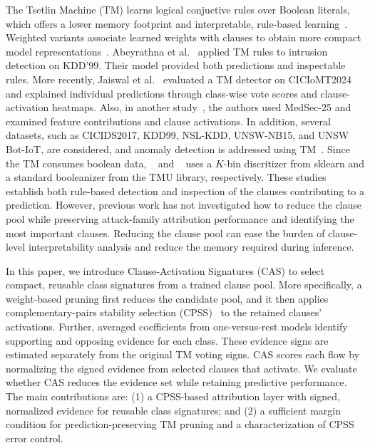 \documentclass[conference]{IEEEtran}
\begin{document}
The Tsetlin Machine (TM) learns logical conjuctive rules over Boolean
literals, which offers a lower memory footprint and interpretable, rule-based learning~\cite{granmo2018}. Weighted variants associate learned weights with clauses to obtain more compact model representations~\cite{phoulady2020}. Abeyrathna
et al.~\cite{abeyrathna2020} applied TM rules to intrusion detection on
KDD'99. Their model provided both predictions and inspectable rules.
More recently, Jaiswal et al.~\cite{jaiswal2026iomt} evaluated a TM detector on CICIoMT2024 and explained individual predictions through class-wise vote scores and clause-activation heatmaps. Also, in another study~\cite{jaiswal2026medsec}, the authors used MedSec-25 and examined feature contributions and clause activations. In addition, several datasets, such as CICIDS2017, KDD99, NSL-KDD, UNSW-NB15, and UNSW Bot-IoT, are considered, and anomaly detection is addressed using TM~\cite{10455063}. Since the TM consumes boolean data, ~\cite{jaiswal2026iomt,jaiswal2026medsec} and ~\cite{10455063} uses a $K$-bin discritizer from sklearn and a standard booleanizer from the TMU library, respectively. These studies establish both rule-based detection and
inspection of the clauses contributing to a prediction. However, previous work has not investigated how to reduce the clause pool while preserving attack-family attribution performance and identifying the most important clauses. Reducing the clause pool can ease the burden of clause-level interpretability analysis and reduce the memory required during inference.
 

In this paper, we introduce Clause-Activation Signatures (CAS)
to select compact, reusable class signatures from a trained clause pool. More specifically, a weight-based pruning first reduces the candidate pool, and it then applies complementary-pairs stability selection (CPSS)~\cite{meinshausen2010,shah2013} to the retained clauses' activations. Further, averaged coefficients from
one-versus-rest models identify supporting and opposing evidence for
each class. These evidence signs are estimated separately from the
original TM voting signs. CAS scores each flow by normalizing the signed
evidence from selected clauses that activate.
We evaluate whether CAS reduces the evidence set while retaining
predictive performance. 
The main contributions are: (1) a CPSS-based attribution layer with signed, normalized evidence for reusable class signatures; and (2) a sufficient margin condition for prediction-preserving TM pruning and a characterization of CPSS error control.
\end{document}

